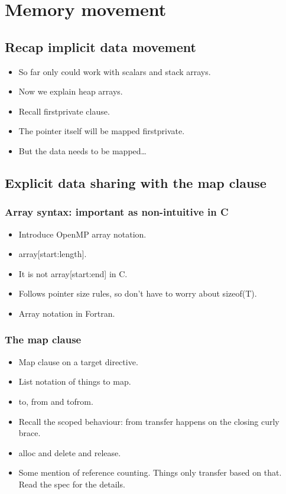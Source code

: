 

\chapter{Memory movement}
\label{chapter:memory}

\section{Recap implicit data movement}
\begin{itemize}
  \item So far only could work with scalars and stack arrays.
  \item Now we explain heap arrays.
  \item Recall firstprivate clause.
  \item The pointer itself will be mapped firstprivate.
  \item But the data needs to be mapped\dots
\end{itemize}

\section{Explicit data sharing with the map clause}
\subsection{Array syntax: important as non-intuitive in C}
\begin{itemize}
  \item Introduce OpenMP array notation.
  \item array[start:length].
  \item It is not array[start:end] in C.
  \item Follows pointer size rules, so don't have to worry about sizeof(T).
  \item Array notation in Fortran.
\end{itemize}

\subsection{The map clause}
\begin{itemize}
  \item Map clause on a target directive.
  \item List notation of things to map.
  \item to, from and tofrom.
  \item Recall the scoped behaviour: from transfer happens on the closing curly brace.
  \item alloc and delete and release.
  \item Some mention of reference counting. Things only transfer based on that. Read the spec for the details.
\end{itemize}

